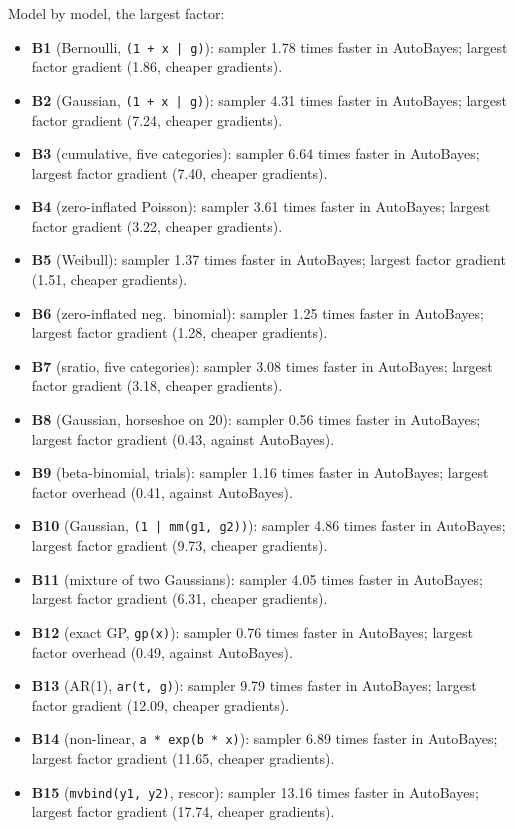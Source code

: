 \documentclass[11pt]{article}
\newcommand{\code}[1]{\texttt{#1}}
\begin{document}
\noindent Model by model, the largest factor:
\begin{itemize}
\item \textbf{B1} (Bernoulli, \code{(1 + x | g)}): sampler 1.78 times faster in AutoBayes; largest factor gradient (1.86, cheaper gradients).
\item \textbf{B2} (Gaussian, \code{(1 + x | g)}): sampler 4.31 times faster in AutoBayes; largest factor gradient (7.24, cheaper gradients).
\item \textbf{B3} (cumulative, five categories): sampler 6.64 times faster in AutoBayes; largest factor gradient (7.40, cheaper gradients).
\item \textbf{B4} (zero-inflated Poisson): sampler 3.61 times faster in AutoBayes; largest factor gradient (3.22, cheaper gradients).
\item \textbf{B5} (Weibull): sampler 1.37 times faster in AutoBayes; largest factor gradient (1.51, cheaper gradients).
\item \textbf{B6} (zero-inflated neg.\ binomial): sampler 1.25 times faster in AutoBayes; largest factor gradient (1.28, cheaper gradients).
\item \textbf{B7} (sratio, five categories): sampler 3.08 times faster in AutoBayes; largest factor gradient (3.18, cheaper gradients).
\item \textbf{B8} (Gaussian, horseshoe on 20): sampler 0.56 times faster in AutoBayes; largest factor gradient (0.43, against AutoBayes).
\item \textbf{B9} (beta-binomial, trials): sampler 1.16 times faster in AutoBayes; largest factor overhead (0.41, against AutoBayes).
\item \textbf{B10} (Gaussian, \code{(1 | mm(g1, g2))}): sampler 4.86 times faster in AutoBayes; largest factor gradient (9.73, cheaper gradients).
\item \textbf{B11} (mixture of two Gaussians): sampler 4.05 times faster in AutoBayes; largest factor gradient (6.31, cheaper gradients).
\item \textbf{B12} (exact GP, \code{gp(x)}): sampler 0.76 times faster in AutoBayes; largest factor overhead (0.49, against AutoBayes).
\item \textbf{B13} (AR(1), \code{ar(t, g)}): sampler 9.79 times faster in AutoBayes; largest factor gradient (12.09, cheaper gradients).
\item \textbf{B14} (non-linear, \code{a * exp(b * x)}): sampler 6.89 times faster in AutoBayes; largest factor gradient (11.65, cheaper gradients).
\item \textbf{B15} (\code{mvbind(y1, y2)}, rescor): sampler 13.16 times faster in AutoBayes; largest factor gradient (17.74, cheaper gradients).

\end{itemize}
\end{document}
